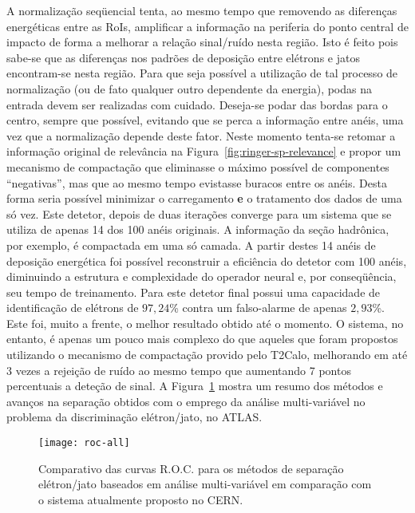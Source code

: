 A normalização seqüencial tenta, ao mesmo tempo que removendo as diferenças
energéticas entre as RoIs, amplificar a informação na periferia do ponto
central de impacto de forma a melhorar a relação sinal/ruído nesta
região. Isto é feito pois sabe-se que as diferenças nos padrões de deposição
entre elétrons e jatos encontram-se nesta região. Para que seja possível a
utilização de tal processo de normalização (ou de fato qualquer outro
dependente da energia), podas na entrada devem ser realizadas com
cuidado. Deseja-se podar das bordas para o centro, sempre que possível,
evitando que se perca a informação entre anéis, uma vez que a normalização
depende deste fator. Neste momento tenta-se retomar a informação original de
relevância na Figura~\ref{fig:ringer-sp-relevance} e propor um mecanismo de
compactação que eliminasse o máximo possível de componentes ``negativas'', mas
que ao mesmo tempo evistasse buracos entre os anéis. Desta forma seria
possível minimizar o carregamento \textbf{e} o tratamento dos dados de uma só
vez. Este detetor, depois de duas iterações converge para um sistema que se
utiliza de apenas 14 dos 100 anéis originais. A informação da seção hadrônica,
por exemplo, é compactada em uma só camada. A partir destes 14 anéis de
deposição energética foi possível reconstruir a eficiência do detetor com 100
anéis, diminuindo a estrutura e complexidade do operador neural e, por
conseqüência, seu tempo de treinamento. Para este detetor final possui uma
capacidade de identificação de elétrons de $97,24$\% contra um falso-alarme de
apenas $2,93$\%. Este foi, muito a frente, o melhor resultado obtido até o
momento. O sistema, no entanto, é apenas um pouco mais complexo do que aqueles
que foram propostos utilizando o mecanismo de compactação provido pelo T2Calo,
melhorando em até 3 vezes a rejeição de ruído ao mesmo tempo que aumentando 7
pontos percentuais a deteção de sinal. A Figura~\ref{fig:roc-all} mostra um
resumo dos métodos e avanços na separação obtidos com o emprego da análise
multi-variável no problema da discriminação elétron/jato, no ATLAS.

\begin{figure}
\begin{center}
\texttt{[image: roc-all]}
\end{center}
\caption{Comparativo das curvas R.O.C. para os métodos de separação
elétron/jato baseados em análise multi-variável em comparação com o sistema
atualmente proposto no CERN.}
\label{fig:roc-all}
\end{figure}

